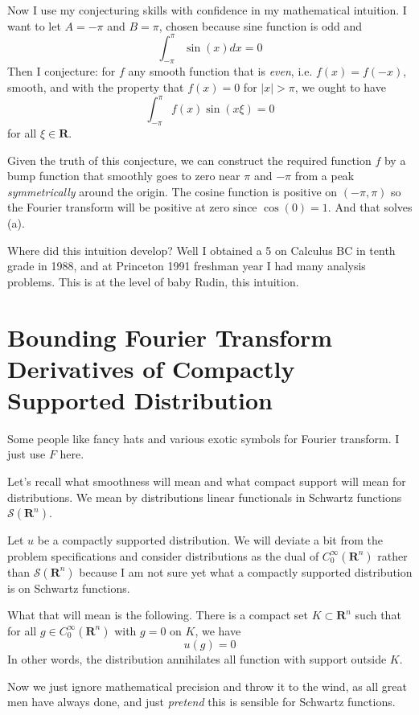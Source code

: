 \documentclass{amsart}
\begin{document}
Now I use my conjecturing skills with confidence in my mathematical intuition.  I want to let $A=-\pi$ and $B=\pi$, chosen because sine function is odd and
\[
\int_{-\pi}^{\pi} \sin(x) dx = 0
\]
Then I conjecture:  for $f$ any smooth function that is {\em even}, i.e. $f(x)=f(-x)$, smooth, and with the property that $f(x) = 0$ for $|x| > \pi$, we ought to have
\[
\int_{-\pi}^{\pi} f(x) \sin(x\xi) = 0
\]
for all $\xi \in \mathbf{R}$.

Given the truth of this conjecture, we can construct the required function $f$ by a bump function that smoothly goes to zero near $\pi$ and $-\pi$ from a peak {\em symmetrically} around the origin.  The cosine function is positive on $(-\pi,\pi)$ so the Fourier transform will be positive at zero since $\cos(0)=1$.  And that solves (a).


Where did this intuition develop?  Well I obtained a 5 on Calculus BC in tenth grade in 1988, and at Princeton 1991 freshman year I had many analysis problems.  This is at the level of baby Rudin, this intuition.  

\section{Bounding Fourier Transform Derivatives of Compactly Supported Distribution}

Some people like fancy hats and various exotic symbols for Fourier transform.  I just use $F$ here.

Let's recall what smoothness will mean and what compact support will mean for distributions.  We mean by distributions linear functionals in Schwartz functions $\mathcal{S}(\mathbf{R}^n)$.

Let $u$ be a compactly supported distribution.  We will deviate a bit from the problem specifications and consider distributions as the dual of $C^\infty_0(\mathbf{R}^n)$ rather than $\mathcal{S}(\mathbf{R}^n)$ because I am not sure yet what a compactly supported distribution is on Schwartz functions.

  What that will mean is the following.  There is a compact set $K \subset \mathbf{R}^n$ such that for all $g \in C^{\infty}_0( \mathbf{R}^n )$ with $g=0$ on $K$, we have
\[
u(g) = 0
\]
In other words, the distribution annihilates all function with support outside $K$.

Now we just ignore mathematical precision and throw it to the wind, as all great men have always done, and just {\em pretend} this is sensible for Schwartz functions. 
\end{document}
